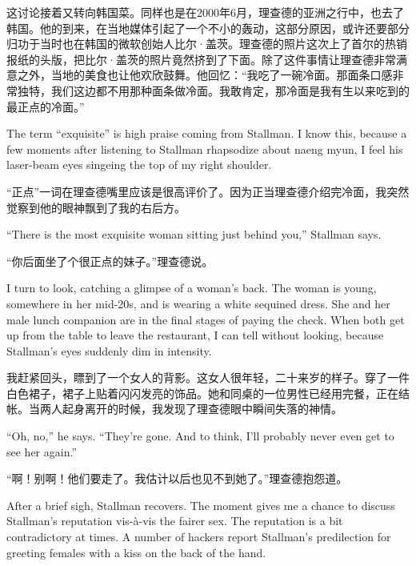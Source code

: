 \ifdefined\chs
这讨论接着又转向韩国菜。同样也是在2000年6月，理查德的亚洲之行中，也去了韩国。他的到来，在当地媒体引起了一个不小的轰动，这部分原因，或许还要部分归功于当时也在韩国的微软创始人比尔·盖茨。理查德的照片这次上了首尔的热销报纸的头版，把比尔·盖茨的照片竟然挤到了下面。除了这件事情让理查德非常满意之外，当地的美食也让他欢欣鼓舞。他回忆：“我吃了一碗冷面。那面条口感非常独特，我们这边都不用那种面条做冷面。我敢肯定，那冷面是我有生以来吃到的最正点的冷面。”
\fi

\ifdefined\eng
The term ``exquisite'' is high praise coming from Stallman. I know this, because a few moments after listening to Stallman rhapsodize about naeng myun, I feel his laser-beam eyes singeing the top of my right shoulder.
\fi

\ifdefined\chs
“正点”一词在理查德嘴里应该是很高评价了。因为正当理查德介绍完冷面，我突然觉察到他的眼神飘到了我的右后方。
\fi

\ifdefined\eng
``There is the most exquisite woman sitting just behind you,'' Stallman says.
\fi

\ifdefined\chs
“你后面坐了个很正点的妹子。”理查德说。
\fi

\ifdefined\eng
I turn to look, catching a glimpse of a woman's back. The woman is young, somewhere in her mid-20s, and is wearing a white sequined dress. She and her male lunch companion are in the final stages of paying the check. When both get up from the table to leave the restaurant, I can tell without looking, because Stallman's eyes suddenly dim in intensity.
\fi

\ifdefined\chs
我赶紧回头，瞟到了一个女人的背影。这女人很年轻，二十来岁的样子。穿了一件白色裙子，裙子上贴着闪闪发亮的饰品。她和同桌的一位男性已经用完餐，正在结帐。当两人起身离开的时候，我发现了理查德眼中瞬间失落的神情。
\fi

\ifdefined\eng
``Oh, no,'' he says. ``They're gone. And to think, I'll probably never even get to see her again.''
\fi

\ifdefined\chs
“啊！别啊！他们要走了。我估计以后也见不到她了。”理查德抱怨道。
\fi

\ifdefined\eng
After a brief sigh, Stallman recovers. The moment gives me a chance to discuss Stallman's reputation vis-à-vis the fairer sex. The reputation is a bit contradictory at times. A number of hackers report Stallman's predilection for greeting females with a kiss on the back of the hand. 
\fi

